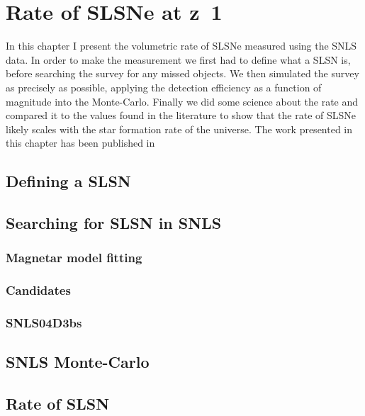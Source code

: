
\chapter{Rate of SLSNe at z~1} %
\label{Chapter3}


In this chapter I present the volumetric rate of SLSNe measured using the SNLS data. In order to make the measurement we first had to define what a SLSN is, before searching the survey for any missed objects. We then simulated the survey as precisely as possible, applying the detection efficiency as a function of magnitude into the Monte-Carlo. Finally we did some science about the rate and compared it to the values found in the literature to show that the rate of SLSNe likely scales with the star formation rate of the universe. The work presented in this chapter has been published in \citet{Prajs2016}

\section{Defining a SLSN}

\section{Searching for SLSN in SNLS}
\subsection{Magnetar model fitting}
\subsection{Candidates}
\subsection{SNLS04D3bs}

\section{SNLS Monte-Carlo}

\section{Rate of SLSN}
